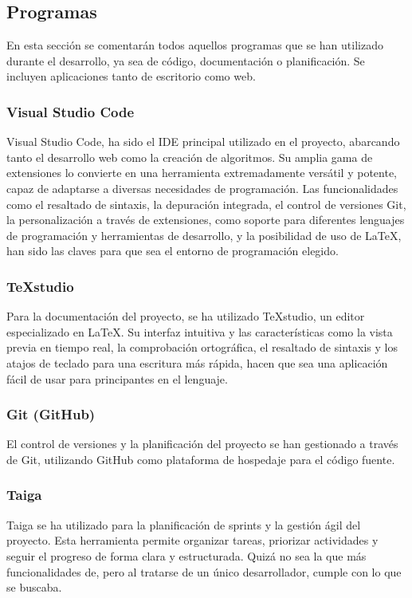 \subsection{Programas}
En esta sección se comentarán todos aquellos programas que se han utilizado durante el desarrollo, ya sea de código, documentación o planificación. Se incluyen aplicaciones tanto de escritorio como web.

\subsubsection{Visual Studio Code}
Visual Studio Code, ha sido el IDE principal utilizado en el proyecto, abarcando tanto el desarrollo web como la creación de algoritmos. Su amplia gama de extensiones lo convierte en una herramienta extremadamente versátil y potente, capaz de adaptarse a diversas necesidades de programación. Las funcionalidades como el resaltado de sintaxis, la depuración integrada, el control de versiones Git, la personalización a través de extensiones, como soporte para diferentes lenguajes de programación y herramientas de desarrollo, y la posibilidad de uso de \LaTeX, han sido las claves para que sea el entorno de programación elegido. 
\subsubsection{TeXstudio}
Para la documentación del proyecto, se ha utilizado TeXstudio, un editor especializado en \LaTeX. Su interfaz intuitiva y las características como la vista previa en tiempo real, la comprobación ortográfica, el resaltado de sintaxis y los atajos de teclado para una escritura más rápida, hacen que sea una aplicación fácil de usar para principantes en el lenguaje.

\subsubsection{Git (GitHub)}
El control de versiones y la planificación del proyecto se han gestionado a través de Git, utilizando GitHub como plataforma de hospedaje para el código fuente.

\subsubsection{Taiga}
Taiga se ha utilizado para la planificación de sprints y la gestión ágil del proyecto. Esta herramienta permite organizar tareas, priorizar actividades y seguir el progreso de forma clara y estructurada. Quizá no sea la que más funcionalidades de, pero al tratarse de un único desarrollador, cumple con lo que se buscaba.

